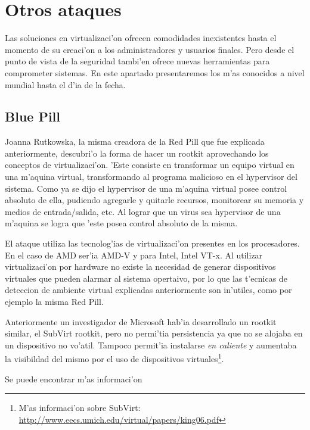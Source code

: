 \section{Otros ataques}

Las soluciones en virtualizaci'on ofrecen comodidades inexistentes hasta el momento de su creaci'on a los administradores y usuarios finales. Pero desde el punto de vista de la seguridad tambi'en ofrece nuevas herramientas para comprometer sistemas. En este apartado presentaremos los m'as conocidos a nivel mundial hasta el d'ia de la fecha. 

\subsection{Blue Pill}

Joanna Rutkowska, la misma creadora de la Red Pill que fue explicada anteriormente, descubri'o la forma de hacer un rootkit aprovechando los conceptos de virtualizaci'on. 'Este consiste en transformar un equipo virtual en una m'aquina virtual, transformando al programa malicioso en el hypervisor del sistema. Como ya se dijo el hypervisor de una m'aquina virtual posee control absoluto de ella, pudiendo agregarle y quitarle recursos, monitorear su memoria y medios de entrada/salida, etc. Al lograr que un virus sea hypervisor de una m'aquina se logra que 'este posea control absoluto de la misma. 

El ataque utiliza las tecnolog'ias de virtualizaci'on presentes en los procesadores. En el caso de AMD ser'ia AMD-V y para Intel, Intel VT-x. Al utilizar virtualizaci'on por hardware no existe la necesidad de generar dispositivos virtuales que pueden alarmar al sistema opertaivo, por lo que las t'ecnicas de deteccion de ambiente virtual explicadas anteriormente son in'utiles, como por ejemplo la misma Red Pill.
 
Anteriormente un investigador de Microsoft hab'ia desarrollado un rootkit similar, el SubVirt rootkit, pero no permi'tia persistencia ya que no se alojaba en un dispositivo no vo'atil. Tampoco permit'ia instalarse {\it en caliente} y aumentaba la visibildad del mismo por el uso de dispositivos virtuales\footnote{M'as informaci'on sobre SubVirt: \url{http://www.eecs.umich.edu/virtual/papers/king06.pdf}}.
 
Se puede encontrar m'as informaci'on